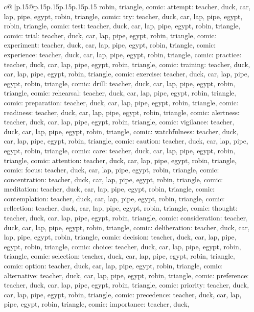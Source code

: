 \documentclass{article}
\begin{document}
{\begin{supertabular}{c@{$\;$}|p{.15\linewidth}@{}p{.15\linewidth}p{.15\linewidth}p{.15\linewidth}p{.15\linewidth}p{.15\linewidth}}
{{{robin, triangle, comic\n\nCLUE: attempt\nTARGETS: teacher, duck, car, lap, pipe, egypt, robin, triangle, comic\n\nCLUE: try\nTARGETS: teacher, duck, car, lap, pipe, egypt, robin, triangle, comic\n\nCLUE: test\nTARGETS: teacher, duck, car, lap, pipe, egypt, robin, triangle, comic\n\nCLUE: trial\nTARGETS: teacher, duck, car, lap, pipe, egypt, robin, triangle, comic\n\nCLUE: experiment\nTARGETS: teacher, duck, car, lap, pipe, egypt, robin, triangle, comic\n\nCLUE: experience\nTARGETS: teacher, duck, car, lap, pipe, egypt, robin, triangle, comic\n\nCLUE: practice\nTARGETS: teacher, duck, car, lap, pipe, egypt, robin, triangle, comic\n\nCLUE: training\nTARGETS: teacher, duck, car, lap, pipe, egypt, robin, triangle, comic\n\nCLUE: exercise\nTARGETS: teacher, duck, car, lap, pipe, egypt, robin, triangle, comic\n\nCLUE: drill\nTARGETS: teacher, duck, car, lap, pipe, egypt, robin, triangle, comic\n\nCLUE: rehearsal\nTARGETS: teacher, duck, car, lap, pipe, egypt, robin, triangle, comic\n\nCLUE: preparation\nTARGETS: teacher, duck, car, lap, pipe, egypt, robin, triangle, comic\n\nCLUE: readiness\nTARGETS: teacher, duck, car, lap, pipe, egypt, robin, triangle, comic\n\nCLUE: alertness\nTARGETS: teacher, duck, car, lap, pipe, egypt, robin, triangle, comic\n\nCLUE: vigilance\nTARGETS: teacher, duck, car, lap, pipe, egypt, robin, triangle, comic\n\nCLUE: watchfulness\nTARGETS: teacher, duck, car, lap, pipe, egypt, robin, triangle, comic\n\nCLUE: caution\nTARGETS: teacher, duck, car, lap, pipe, egypt, robin, triangle, comic\n\nCLUE: care\nTARGETS: teacher, duck, car, lap, pipe, egypt, robin, triangle, comic\n\nCLUE: attention\nTARGETS: teacher, duck, car, lap, pipe, egypt, robin, triangle, comic\n\nCLUE: focus\nTARGETS: teacher, duck, car, lap, pipe, egypt, robin, triangle, comic\n\nCLUE: concentration\nTARGETS: teacher, duck, car, lap, pipe, egypt, robin, triangle, comic\n\nCLUE: meditation\nTARGETS: teacher, duck, car, lap, pipe, egypt, robin, triangle, comic\n\nCLUE: contemplation\nTARGETS: teacher, duck, car, lap, pipe, egypt, robin, triangle, comic\n\nCLUE: reflection\nTARGETS: teacher, duck, car, lap, pipe, egypt, robin, triangle, comic\n\nCLUE: thought\nTARGETS: teacher, duck, car, lap, pipe, egypt, robin, triangle, comic\n\nCLUE: consideration\nTARGETS: teacher, duck, car, lap, pipe, egypt, robin, triangle, comic\n\nCLUE: deliberation\nTARGETS: teacher, duck, car, lap, pipe, egypt, robin, triangle, comic\n\nCLUE: decision\nTARGETS: teacher, duck, car, lap, pipe, egypt, robin, triangle, comic\n\nCLUE: choice\nTARGETS: teacher, duck, car, lap, pipe, egypt, robin, triangle, comic\n\nCLUE: selection\nTARGETS: teacher, duck, car, lap, pipe, egypt, robin, triangle, comic\n\nCLUE: option\nTARGETS: teacher, duck, car, lap, pipe, egypt, robin, triangle, comic\n\nCLUE: alternative\nTARGETS: teacher, duck, car, lap, pipe, egypt, robin, triangle, comic\n\nCLUE: preference\nTARGETS: teacher, duck, car, lap, pipe, egypt, robin, triangle, comic\n\nCLUE: priority\nTARGETS: teacher, duck, car, lap, pipe, egypt, robin, triangle, comic\n\nCLUE: precedence\nTARGETS: teacher, duck, car, lap, pipe, egypt, robin, triangle, comic\n\nCLUE: importance\nTARGETS: teacher, duck, }}}
\end{supertabular}}
\end{document}
